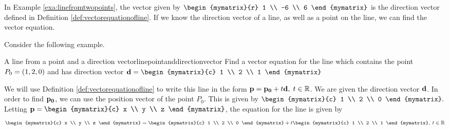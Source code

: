 In Example \ref{exa:linefromtwopoints}, the vector given by 
$\begin{mymatrix}{r}
 1 \\
-6 \\
6 
\end{mymatrix}$
is the direction vector defined in Definition \ref{def:vectorequationofline}.
If we know the direction vector of a line, as well as a point on the line,
we can find the vector equation. 

Consider the following example. 

\begin{example}{A line from a point and a direction vector}{linepointanddirectionvector}
Find a vector equation for the line which contains the point $P_0 = \left(
1,2,0\right) $ and has direction vector $\vect{d} = 
\begin{mymatrix}{c}
1 \\
2 \\
1
\end{mymatrix}
$
\end{example}

\begin{solution}
We will use Definition \ref{def:vectorequationofline} to write this line in the form 
${\bf p}={\bf p_0}+t{\bf d},\; t\in \mathbb{R}$. We are given the direction vector ${\bf d}$. 
In order to find ${\bf p_0}$, we can use the position vector of the point $P_0$. 
This is given by 
$\begin{mymatrix}{c}
1 \\
2 \\
0
\end{mymatrix}.
$
Letting $\vect{p}
=
\begin{mymatrix}{c}
 x \\
y \\
z
\end{mymatrix}
$,
the equation for the line is given by 
\begin{equation}
\begin{mymatrix}{c}
x \\
y \\
z
\end{mymatrix}
=
\begin{mymatrix}{c}
1 \\
2 \\
0
\end{mymatrix}
+ 
t
\begin{mymatrix}{c}
1 \\
2 \\
1
\end{mymatrix},
\;t\in
\R \label{vectoreqn}
\end{equation}
\end{solution}

